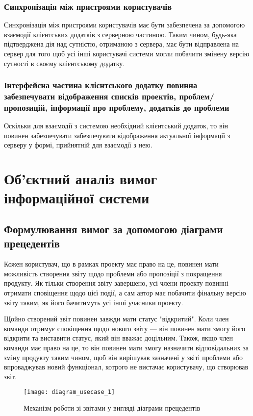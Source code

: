 \documentclass[../main.tex]{subfiles}
\begin{document}
\subsubsection{Синхронізація між пристроями користувачів}
Синхронізація між пристроями користувачів має бути забезпечена за допомогою взаємодії клієнтських додатків з серверною частиною. Таким чином, будь-яка підтверджена дія над сутністю, отриманою з сервера, має бути відправлена на сервер для того щоб усі інші користувачі системи могли побачити змінену версію сутності в своєму клієнтському додатку.

\subsubsection{Інтерфейсна частина клієнтського додатку повинна забезпечувати відображення списків проектів, проблем/пропозицій, інформації про проблему, додатків до проблеми}
Оскільки для взаємодії з системою необхідний клієнтський додаток, то він повинен забезпечувати забезпечувати відображення актуальної інформації з серверу у формі, прийнятній для взаємодії з нею.

\section{Об'єктний аналіз вимог інформаційної системи}

\subsection{Формулювання вимог за допомогою діаграми прецедентів}

Кожен користувач, що в рамках проекту має право на це, повинен мати можливість створення звіту щодо проблеми або пропозіції з покращення продукту. Як тільки створення звіту завершено, усі члени проекту повинні отримати сповіщення щодо цієї події, а сам автор має побачити фінальну версію звіту таким, як його бачитимуть усі інші учасники проекту.

Щойно створений звіт повинен завжди мати статус "відкритий". Коли член команди отримує сповіщення щодо нового звіту — він повинен мати змогу його відкрити та виставити статус, який він вважає доцільним. Також, якщо член команди має право на це, то він повинен мати змогу назначити відповідальних за зміну продукту таким чином, щоб він вирішував зазначені у звіті проблеми або впроваджував новий функціонал, котрого не вистачає користувачу, що створював звіт.

\begin{figure}[H]
\centering
\texttt{[image: diagram\_usecase\_1]}
\caption{Механізм роботи зі звітами у вигляді діаграми прецедентів}
\end{figure}
\end{document}
